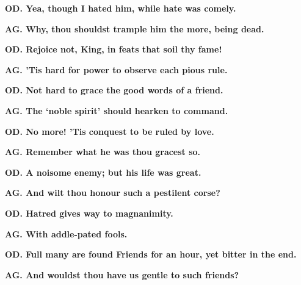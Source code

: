 \documentclass[11pt,letter]{book}
\begin{document}
\par \textbf{OD. Yea, though I hated him, while hate was comely.}
\par 

\par \textbf{AG. Why, thou shouldst trample him the more, being dead.}
\par 

\par \textbf{OD. Rejoice not, King, in feats that soil thy fame!}
\par 

\par \textbf{AG. ’Tis hard for power to observe each pious rule.}
\par 

\par \textbf{OD. Not hard to grace the good words of a friend.}
\par 

\par \textbf{AG. The ‘noble spirit’ should hearken to command.}
\par 

\par \textbf{OD. No more! ’Tis conquest to be ruled by love.}
\par 

\par \textbf{AG. Remember what he was thou gracest so.}
\par 

\par \textbf{OD. A noisome enemy; but his life was great.}
\par 

\par \textbf{AG. And wilt thou honour such a pestilent corse?}
\par 

\par \textbf{OD. Hatred gives way to magnanimity.}
\par 

\par \textbf{AG. With addle-pated fools.}
\par 

\par \textbf{OD. Full many are found Friends for an hour, yet bitter in the end.}
\par 

\par \textbf{AG. And wouldst thou have us gentle to such friends?}
\par 
\end{document}
